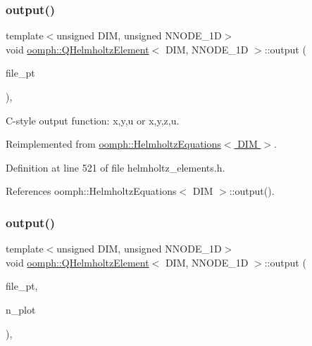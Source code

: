 \subsubsection{\texorpdfstring{output()}{output()}\hspace{0.1cm}{\footnotesize\ttfamily [3/4]}}
{\footnotesize\ttfamily template$<$unsigned D\+IM, unsigned N\+N\+O\+D\+E\+\_\+1D$>$ \\
void \hyperlink{classoomph_1_1QHelmholtzElement}{oomph\+::\+Q\+Helmholtz\+Element}$<$ D\+IM, N\+N\+O\+D\+E\+\_\+1D $>$\+::output (\begin{DoxyParamCaption}\item[{F\+I\+LE $\ast$}]{file\+\_\+pt }\end{DoxyParamCaption})\hspace{0.3cm}{\ttfamily [inline]}, {\ttfamily [virtual]}}



C-\/style output function\+: x,y,u or x,y,z,u. 



Reimplemented from \hyperlink{classoomph_1_1HelmholtzEquations_a4ff9181e482ccaf3ae94b452e0efa9a1}{oomph\+::\+Helmholtz\+Equations$<$ D\+I\+M $>$}.



Definition at line 521 of file helmholtz\+\_\+elements.\+h.



References oomph\+::\+Helmholtz\+Equations$<$ D\+I\+M $>$\+::output().

\mbox{\label{classoomph_1_1QHelmholtzElement_a235f2ddc4141b070590e8e19f1924b21}} 
\subsubsection{\texorpdfstring{output()}{output()}\hspace{0.1cm}{\footnotesize\ttfamily [4/4]}}
{\footnotesize\ttfamily template$<$unsigned D\+IM, unsigned N\+N\+O\+D\+E\+\_\+1D$>$ \\
void \hyperlink{classoomph_1_1QHelmholtzElement}{oomph\+::\+Q\+Helmholtz\+Element}$<$ D\+IM, N\+N\+O\+D\+E\+\_\+1D $>$\+::output (\begin{DoxyParamCaption}\item[{F\+I\+LE $\ast$}]{file\+\_\+pt,  }\item[{const unsigned \&}]{n\+\_\+plot }\end{DoxyParamCaption})\hspace{0.3cm}{\ttfamily [inline]}, {\ttfamily [virtual]}}



